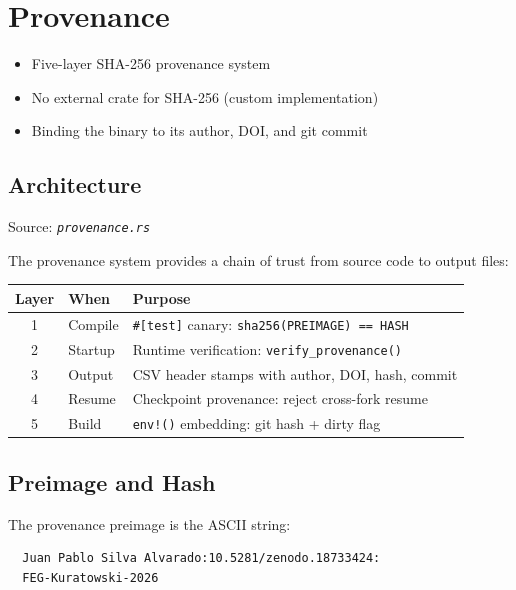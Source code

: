 \documentclass[11pt, a4paper, openany]{book}
\newcommand{\code}[1]{\texttt{#1}}
\newcommand{\func}[1]{\texttt{\color{structure}#1}}
\newcommand{\file}[1]{\texttt{\itshape #1}}
\newenvironment{introduction}[1][Chapter Overview]{%
  \begin{tcolorbox}[
    enhanced,colback=structure!5,colframe=structure,
    colbacktitle=structure,coltitle=white,
    fonttitle=\small\bfseries,title={#1},
    arc=2pt,boxrule=0.7pt,
    left=8pt,right=8pt,top=6pt,bottom=6pt,
    before skip=12pt,after skip=12pt
  ]\itshape\begin{itemize}[leftmargin=*,itemsep=2pt,parsep=0pt]
}{%
  \end{itemize}\end{tcolorbox}
}
\begin{document}
\chapter{Provenance}

\begin{introduction}
  \item Five-layer SHA-256 provenance system
  \item No external crate for SHA-256 (custom implementation)
  \item Binding the binary to its author, DOI, and git commit
\end{introduction}

\section{Architecture}

Source: \file{provenance.rs}

The provenance system provides a chain of trust from source code to output files:

\begin{longtable}{clp{8cm}}
  \toprule
  \textbf{Layer} & \textbf{When} & \textbf{Purpose} \\
  \midrule
  1 & Compile & \code{\#[test]} canary: \code{sha256(PREIMAGE) == HASH} \\
  2 & Startup & Runtime verification: \func{verify\_provenance()} \\
  3 & Output  & CSV header stamps with author, DOI, hash, commit \\
  4 & Resume  & Checkpoint provenance: reject cross-fork resume \\
  5 & Build   & \code{env!()} embedding: git hash + dirty flag \\
  \bottomrule
\end{longtable}

\section{Preimage and Hash}

The provenance preimage is the ASCII string:

\begin{verbatim}
  Juan Pablo Silva Alvarado:10.5281/zenodo.18733424:
  FEG-Kuratowski-2026
\end{verbatim}
\end{document}
